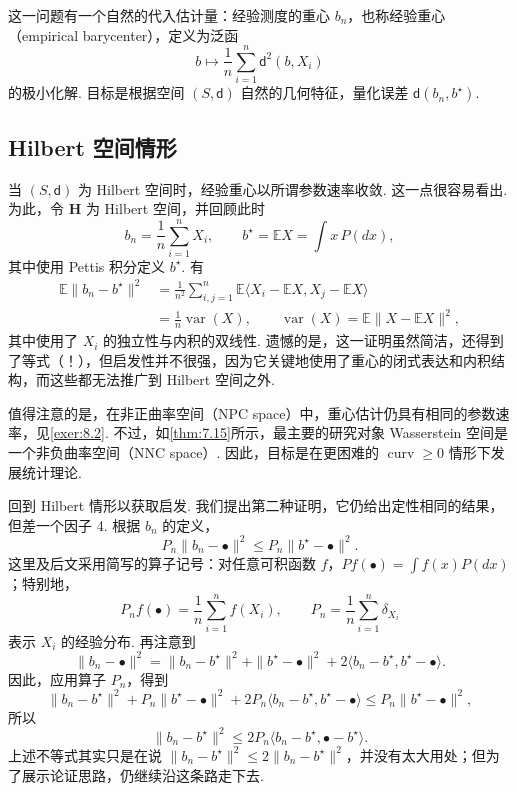 这一问题有一个自然的代入估计量：经验测度的重心 $b_n$，也称经验重心（empirical barycenter），定义为泛函
$$b\longmapsto\frac1n\sum_{i=1}^n\mathsf d^2(b,X_i)$$
的极小化解. 目标是根据空间 $(S,\mathsf d)$ 自然的几何特征，量化误差 $\mathsf d(b_n,b^\star)$.

\subsection{Hilbert 空间情形}\label{sec:8.1}
当 $(S,\mathsf d)$ 为 Hilbert 空间时，经验重心以所谓参数速率收敛. 这一点很容易看出. 为此，令 $\mathbf H$ 为 Hilbert 空间，并回顾此时
$$b_n=\frac1n\sum_{i=1}^n X_i,\qquad b^\star=\mathbb EX=\int x\,P(dx),$$
其中使用 Pettis 积分定义 $b^\star$. 有
$$\begin{aligned}
\mathbb E\|b_n-b^\star\|^2&=\frac1{n^2}\sum_{i,j=1}^n
\mathbb E\langle X_i-\mathbb EX,X_j-\mathbb EX\rangle\\
&=\frac1n\operatorname{var}(X),\qquad
\operatorname{var}(X)=\mathbb E\|X-\mathbb EX\|^2,
\end{aligned}$$
其中使用了 $X_i$ 的独立性与内积的双线性. 遗憾的是，这一证明虽然简洁，还得到了等式（！），但启发性并不很强，因为它关键地使用了重心的闭式表达和内积结构，而这些都无法推广到 Hilbert 空间之外.

值得注意的是，在非正曲率空间（NPC space）中，重心估计仍具有相同的参数速率，见\autoref{exer:8.2}. 不过，如\autoref{thm:7.15}所示，最主要的研究对象 Wasserstein 空间是一个非负曲率空间（NNC space）. 因此，目标是在更困难的 $\operatorname{curv}\ge0$ 情形下发展统计理论.

回到 Hilbert 情形以获取启发. 我们提出第二种证明，它仍给出定性相同的结果，但差一个因子 4. 根据 $b_n$ 的定义，
$$P_n\|b_n-\bullet\|^2\le P_n\|b^\star-\bullet\|^2.$$
这里及后文采用简写的算子记号：对任意可积函数 $f$，$Pf(\bullet)=\int f(x)P(dx)$；特别地，
$$P_nf(\bullet)=\frac1n\sum_{i=1}^n f(X_i),\qquad
P_n=\frac1n\sum_{i=1}^n\delta_{X_i}$$
表示 $X_i$ 的经验分布. 再注意到
$$\|b_n-\bullet\|^2=\|b_n-b^\star\|^2+\|b^\star-\bullet\|^2
+2\langle b_n-b^\star,b^\star-\bullet\rangle.$$
因此，应用算子 $P_n$，得到
$$\|b_n-b^\star\|^2+P_n\|b^\star-\bullet\|^2
+2P_n\langle b_n-b^\star,b^\star-\bullet\rangle\le P_n\|b^\star-\bullet\|^2,$$
所以
$$\|b_n-b^\star\|^2\le2P_n\langle b_n-b^\star,\bullet-b^\star\rangle.$$
上述不等式其实只是在说 $\|b_n-b^\star\|^2\le2\|b_n-b^\star\|^2$，并没有太大用处；但为了展示论证思路，仍继续沿这条路走下去.

